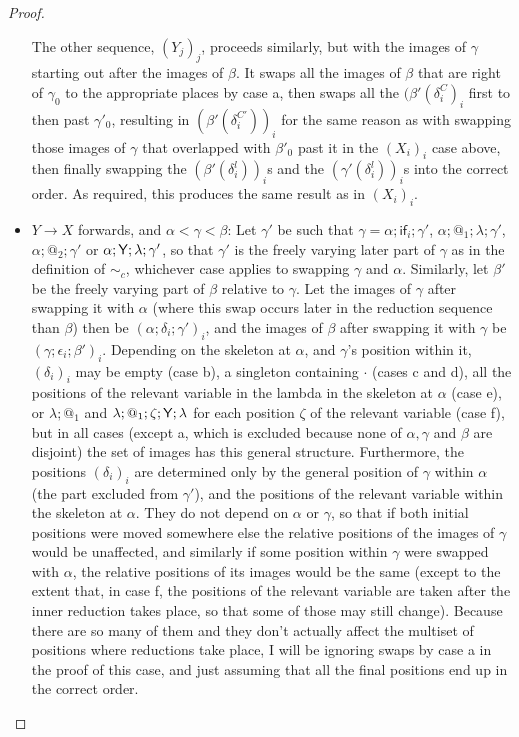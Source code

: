 \begin{proof}
\begin{itemize}
  The other sequence, $(Y_j)_j$, proceeds similarly, but with the images of $\gamma$ starting out after the images of $\beta$. It swaps all the images of $\beta$ that are right of $\gamma_0$ to the appropriate places by case a, then swaps all the $(\beta'(\delta^C_i)_i$ first to then past $\gamma'_0$, resulting in $(\beta'(\delta^{C'}_i))_i$ for the same reason as with swapping those images of $\gamma$ that overlapped with $\beta'_0$ past it in the $(X_i)_i$ case above, then finally swapping the $(\beta'(\delta^l_i))_i$s and the $(\gamma'(\delta^l_i))_i$s into the correct order. As required, this produces the same result as in $(X_i)_i$.
  \item $Y \to X$ forwards, and $\alpha < \gamma < \beta$: Let $\gamma'$ be such that $\gamma = \alpha;\textsf{if}_i;\gamma'$, $\alpha;@_1;\lambda;\gamma'$, $\alpha;@_2;\gamma'$ or $\alpha;\mathsf{Y};\lambda;\gamma'$, so that $\gamma'$ is the freely varying later part of $\gamma$ as in the definition of $\sim_c$, whichever case applies to swapping $\gamma$ and $\alpha$. Similarly, let $\beta'$ be the freely varying part of $\beta$ relative to $\gamma$. Let the images of $\gamma$ after swapping it with $\alpha$ (where this swap occurs later in the reduction sequence than $\beta$) then be $(\alpha;\delta_i;\gamma')_i$, and the images of $\beta$ after swapping it with $\gamma$ be $(\gamma;\epsilon_i;\beta')_i$. Depending on the skeleton at $\alpha$, and $\gamma$'s position within it, $(\delta_i)_i$ may be empty (case b), a singleton containing $\cdot$ (cases c and d), all the positions of the relevant variable in the lambda in the skeleton at $\alpha$ (case e), or $\lambda;@_1$ and $\lambda;@_1;\zeta;\mathsf{Y};\lambda$ for each position $\zeta$ of the relevant variable (case f), but in all cases (except a, which is excluded because none of $\alpha, \gamma$ and $\beta$ are disjoint) the set of images has this general structure. Furthermore, the positions $(\delta_i)_i$ are determined only by the general position of $\gamma$ within $\alpha$ (the part excluded from $\gamma'$), and the positions of the relevant variable within the skeleton at $\alpha$. They do not depend on $\alpha$ or $\gamma$, so that if both initial positions were moved somewhere else the relative positions of the images of $\gamma$ would be unaffected, and similarly if some position within $\gamma$ were swapped with $\alpha$, the relative positions of its images would be the same (except to the extent that, in case f, the positions of the relevant variable are taken after the inner reduction takes place, so that some of those may still change). Because there are so many of them and they don't actually affect the multiset of positions where reductions take place, I will be ignoring swaps by case a in the proof of this case, and just assuming that all the final positions end up in the correct order.
  

\end{itemize}
\end{proof}
